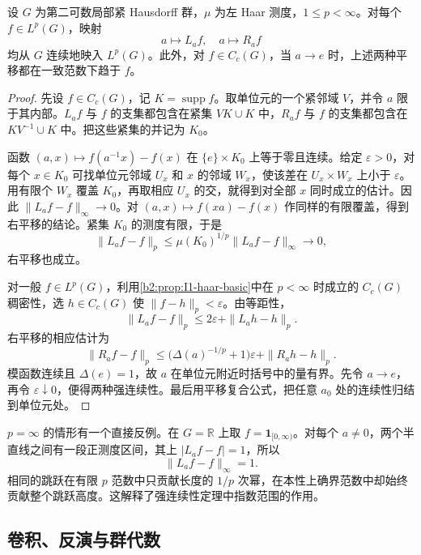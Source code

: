 \begin{proposition}[平移的强连续性]
\label{b2:prop:I2-translation}
设 \(G\) 为第二可数局部紧 Hausdorff 群，\(\mu\) 为左 Haar 测度，\(1\le p<\infty\)。对每个 \(f\in L^p(G)\)，映射
\[
 a\longmapsto L_af,\quad a\longmapsto R_af
\]
均从 \(G\) 连续地映入 \(L^p(G)\)。此外，对 \(f\in C_c(G)\)，当 \(a\to e\) 时，上述两种平移都在一致范数下趋于 \(f\)。
\end{proposition}
\begin{proof}
先设 \(f\in C_c(G)\)，记 \(K=\operatorname{supp}f\)。取单位元的一个紧邻域 \(V\)，并令 \(a\) 限于其内部。\(L_af\) 与 \(f\) 的支集都包含在紧集 \(VK\cup K\) 中，\(R_af\) 与 \(f\) 的支集都包含在 \(KV^{-1}\cup K\) 中。把这些紧集的并记为 \(K_0\)。

函数 \((a,x)\mapsto f(a^{-1}x)-f(x)\) 在 \(\{e\}\times K_0\) 上等于零且连续。给定 \(\varepsilon>0\)，对每个 \(x\in K_0\) 可找单位元邻域 \(U_x\) 和 \(x\) 的邻域 \(W_x\)，使该差在 \(U_x\times W_x\) 上小于 \(\varepsilon\)。用有限个 \(W_x\) 覆盖 \(K_0\)，再取相应 \(U_x\) 的交，就得到对全部 \(x\) 同时成立的估计。因此 \(\|L_af-f\|_\infty\to0\)。对 \((a,x)\mapsto f(xa)-f(x)\) 作同样的有限覆盖，得到右平移的结论。紧集 \(K_0\) 的测度有限，于是
\[
 \|L_af-f\|_p\le\mu(K_0)^{1/p}\|L_af-f\|_\infty\longrightarrow0,
\]
右平移也成立。

对一般 \(f\in L^p(G)\)，利用\cref{b2:prop:I1-haar-basic}中在 \(p<\infty\) 时成立的 \(C_c(G)\) 稠密性，选 \(h\in C_c(G)\) 使 \(\|f-h\|_p<\varepsilon\)。由等距性，
\[
 \|L_af-f\|_p\le2\varepsilon+\|L_ah-h\|_p.
\]
右平移的相应估计为
\[
 \|R_af-f\|_p
 \le\bigl(\Delta(a)^{-1/p}+1\bigr)\varepsilon+\|R_ah-h\|_p.
\]
模函数连续且 \(\Delta(e)=1\)，故 \(a\) 在单位元附近时括号中的量有界。先令 \(a\to e\)，再令 \(\varepsilon\downarrow0\)，便得两种强连续性。最后用平移复合公式，把任意 \(a_0\) 处的连续性归结到单位元处。
\end{proof}

\(p=\infty\) 的情形有一个直接反例。在 \(G=\mathbb R\) 上取 \(f=\mathbf1_{[0,\infty)}\)。对每个 \(a\ne0\)，两个半直线之间有一段正测度区间，其上 \(|L_af-f|=1\)，所以
\[
 \|L_af-f\|_\infty=1.
\]
相同的跳跃在有限 \(p\) 范数中只贡献长度的 \(1/p\) 次幂，在本性上确界范数中却始终贡献整个跳跃高度。这解释了强连续性定理中指数范围的作用。

\subsection{卷积、反演与群代数}
\label{b2:subsec:I20202}

